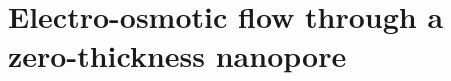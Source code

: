 \chapter{Electro-osmotic flow through a zero-thickness nanopore}
\label{chpt:zero_thickness}
\providecommand\bcdot{\boldsymbol{\cdot}}
\newcommand\biS{\boldsymbol{S}}
\newcommand\etb{\boldsymbol{\eta}}

\newcommand\Real{\mbox{Re}} %
\newcommand\Imag{\mbox{Im}} %
\newcommand\Rey{\mbox{\textit{Re}}}  %
\newcommand\Pran{\mbox{\textit{Pr}}} %
\newcommand\Pen{\mbox{\textit{Pe}}}  %
\newcommand\Ai{\mbox{Ai}}            %
\newcommand\Bi{\mbox{Bi}}            %

\newcommand\ssC{\mathsf{C}}    %
\newcommand\sfsP{\mathsfi{P}}  %
\newcommand\slsQ{\mathsfbi{Q}} %

\newcommand\hatp{\skew3\hat{p}}      %
\newcommand\hatR{\skew3\hat{R}}      %
\newcommand\hatRR{\skew3\hat{\hatR}} %
\newcommand\doubletildesigma{\skew2\tilde{\skew2\tilde{\Sigma}}}%

\newsavebox{\astrutbox}
\sbox{\astrutbox}{\rule[-5pt]{0pt}{20pt}}
\newcommand{\astrut}{\usebox{\astrutbox}}

\newcommand\GaPQ{\ensuremath{G_a(P,Q)}}
\newcommand\GsPQ{\ensuremath{G_s(P,Q)}}
\newcommand\p{\ensuremath{\partial}}
\newcommand\tti{\ensuremath{\rightarrow\infty}}
\newcommand\kgd{\ensuremath{k\gamma d}}
\newcommand\shalf{\ensuremath{{\scriptstyle\frac{1}{2}}}}
\newcommand\sh{\ensuremath{^{\shalf}}}
\newcommand\smh{\ensuremath{^{-\shalf}}}
\newcommand\squart{\ensuremath{{\textstyle\frac{1}{4}}}}
\newcommand\thalf{\ensuremath{{\textstyle\frac{1}{2}}}}
\newcommand\Gat{\ensuremath{\widetilde{G_a}}}
\newcommand\ttz{\ensuremath{\rightarrow 0}}
\newcommand\ndq{\ensuremath{\frac{\mbox{$\partial$}}{\mbox{$\partial$}n_q}}}
\newcommand\sumjm{\ensuremath{\sum_{j=1}^{M}}}
\newcommand\pvi{\ensuremath{\int_0^{\infty}%
\mskip \ifCUPmtlplainloaded -30mu\else -33mu\fi -\quad}}

\newcommand\etal{\mbox{\textit{et al.}}}
\newcommand\etc{etc.\ }
\newcommand\eg{e.g.\ }

